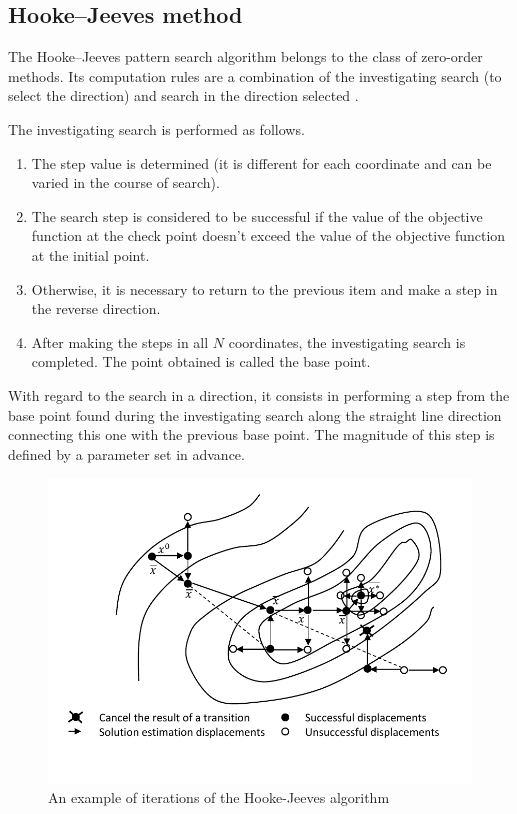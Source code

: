 \documentclass{svproc}
\begin{document}
\subsection{Hooke--Jeeves method}\label{SecHG}

The Hooke--Jeeves pattern search algorithm belongs to the class of zero-order methods. Its computation rules are a  combination of the investigating search (to select the direction) and search in the direction selected  \cite{Himmelblau72}.

The investigating search is performed as follows. 
\begin{enumerate} 
\item	The step value is determined (it is different for each coordinate and can be varied in the course  of search).  
\item	The search step is considered to be successful if the value of the objective function at the check  point doesn't exceed the value of the objective function at the initial point.  
\item	Otherwise, it is necessary to return to the previous item and make a step in the reverse direction.  
\item	After making the steps in all $N$ coordinates, the investigating search is completed. The point  obtained is called the base point. 
\end{enumerate}

With regard to the search in a direction, it consists in performing a step from the base point found  during the investigating search along the straight line direction connecting this one with the previous  base point. The magnitude of this step is defined by a parameter set in advance.

\begin{figure}[!h] 
	\begin{center} 
		\begin{minipage}[h]{0.8\linewidth} 
			\includegraphics[width=1\linewidth]{figure/fig1.pdf} 
			\caption{An example of iterations of the Hooke-Jeeves algorithm} %
			\label{fig:fig1} 
		\end{minipage} 
	\end{center} 
\end{figure}	
\end{document}
